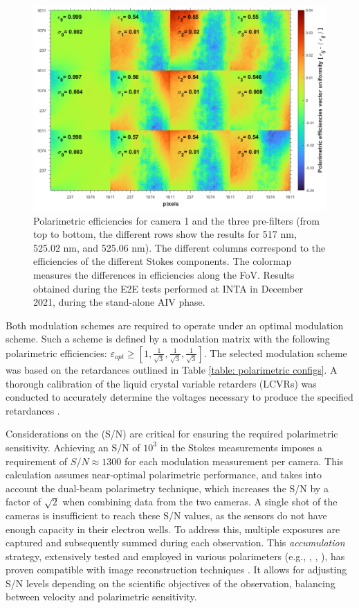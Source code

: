 \begin{figure}[t]
    \includegraphics[width=\textwidth]{figures/TuMag/Pol_efficiencies_map.png}
    \caption[TuMag's polarimetric efficiencies.]{Polarimetric efficiencies for camera 1 and the three pre-filters (from top to bottom, the different rows show the results for 517 nm, 525.02 nm, and 525.06 nm). The different columns correspond to the efficiencies of the different Stokes components. The colormap measures the differences in efficiencies along the FoV. Results obtained during the E2E tests performed at INTA in December 2021, during the stand-alone AIV phase. 
    \label{fig_tumag:pol eff maps}}
\end{figure}

Both modulation schemes are required to operate under an optimal modulation scheme. Such a scheme is defined by a modulation matrix with the following polarimetric efficiencies: $\varepsilon _{opt} \geqslant [1, \frac{1}{\sqrt{3}}, \frac{1}{\sqrt{3}}, \frac{1}{\sqrt{3}}]$. The selected modulation scheme was based on the retardances outlined in Table \ref{table: polarimetric configs}. A thorough calibration of the liquid crystal variable retarders (LCVRs) was conducted to accurately determine the voltages necessary to produce the specified retardances \citep{fine-tunin}.

Considerations on the (S/N) are critical for ensuring the required polarimetric sensitivity. Achieving an S/N of $10^3$ in the Stokes measurements imposes a requirement of $S/N \approx 1300$  for each modulation measurement per camera. This calculation assumes near-optimal polarimetric performance, and takes into account the dual-beam polarimetry technique, which increases the S/N by a factor of $\sqrt{2}$ when combining data from the two cameras. A single shot of the cameras is insufficient to reach these S/N values, as the sensors do not have enough capacity in their electron wells. To address this, multiple exposures are captured and subsequently summed during each observation. This \textit{accumulation} strategy, extensively tested and employed in various polarimeters (e.g., \citealt{accs1}, \citealt{accs2}, \citealt{accs3}), has proven compatible with image reconstruction techniques \citep{accs-image1, accs-image2}. It allows for adjusting S/N levels depending on the scientific objectives of the observation, balancing between velocity and polarimetric sensitivity.

